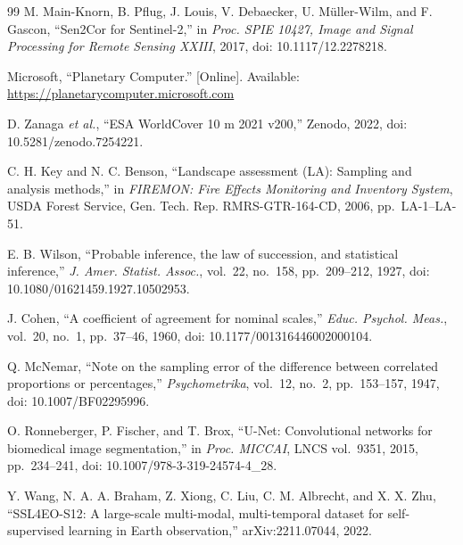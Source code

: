 \documentclass[conference]{IEEEtran}
\begin{document}
\begin{thebibliography}{99}
 M. Main-Knorn, B. Pflug, J. Louis, V. Debaecker, U. M\"uller-Wilm, and
F. Gascon, ``Sen2Cor for Sentinel-2,'' in \emph{Proc. SPIE 10427, Image and Signal Processing for
Remote Sensing XXIII}, 2017, doi: 10.1117/12.2278218.

 Microsoft, ``Planetary Computer.'' [Online]. Available:
\url{https://planetarycomputer.microsoft.com}

 D. Zanaga \emph{et al.}, ``ESA WorldCover 10 m 2021 v200,'' Zenodo, 2022,
doi: 10.5281/zenodo.7254221.

 C. H. Key and N. C. Benson, ``Landscape assessment (LA): Sampling and
analysis methods,'' in \emph{FIREMON: Fire Effects Monitoring and Inventory System}, USDA Forest
Service, Gen. Tech. Rep. RMRS-GTR-164-CD, 2006, pp.~LA-1--LA-51.

 E. B. Wilson, ``Probable inference, the law of succession, and statistical
inference,'' \emph{J. Amer. Statist. Assoc.}, vol.~22, no.~158, pp.~209--212, 1927,
doi: 10.1080/01621459.1927.10502953.

 J. Cohen, ``A coefficient of agreement for nominal scales,'' \emph{Educ.
Psychol. Meas.}, vol.~20, no.~1, pp.~37--46, 1960, doi: 10.1177/001316446002000104.

 Q. McNemar, ``Note on the sampling error of the difference between
correlated proportions or percentages,'' \emph{Psychometrika}, vol.~12, no.~2, pp.~153--157, 1947,
doi: 10.1007/BF02295996.

 O. Ronneberger, P. Fischer, and T. Brox, ``U-Net: Convolutional networks
for biomedical image segmentation,'' in \emph{Proc. MICCAI}, LNCS vol.~9351, 2015, pp.~234--241,
doi: 10.1007/978-3-319-24574-4\_28.

 Y. Wang, N. A. A. Braham, Z. Xiong, C. Liu, C. M. Albrecht, and X. X. Zhu,
``SSL4EO-S12: A large-scale multi-modal, multi-temporal dataset for self-supervised learning in
Earth observation,'' arXiv:2211.07044, 2022.
\end{thebibliography}
\end{document}

